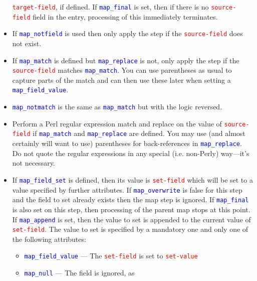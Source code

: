 \documentclass{ltxdockit}
\begin{document}
\begin{itemize}
  \textcolor{red}{\texttt{target-field}}, if defined. If
  \textcolor{blue}{\texttt{map\_final}} is set, then if there is no
  \textcolor{red}{\texttt{source-field}} field in the entry, processing of
  this  immediately terminates.
\item If \textcolor{blue}{\texttt{map\_notfield}} is used then only apply
  the step if the \textcolor{red}{\texttt{source-field}} does not exist.
\item If \textcolor{blue}{\texttt{map\_match}} is defined but
  \textcolor{blue}{\texttt{map\_replace}} is not, only apply the
  step if the \textcolor{red}{\texttt{source-field}} matches
  \textcolor{blue}{\texttt{map\_match}}. You can use parentheses as usual
  to capture parts of the match and can then use these later when setting a \textcolor{blue}{\texttt{map\_field\_value}}.
\item \textcolor{blue}{\texttt{map\_notmatch}} is the same as
  \textcolor{blue}{\texttt{map\_match}} but with the logic reversed.
\item Perform a Perl regular expression match and replace on the value of
  \textcolor{red}{\texttt{source-field}} if
  \textcolor{blue}{\texttt{map\_match}} and
  \textcolor{blue}{\texttt{map\_replace}} are defined. You may use (and almost certainly
  will want to use) parentheses for back-references in \textcolor{blue}{\texttt{map\_replace}}.
  Do not quote the regular expressions in any special (i.e. non-Perly) way---it's not
  necessary.
\item If \textcolor{blue}{\texttt{map\_field\_set}} is defined, then its
  value is \textcolor{red}{\texttt{set-field}} which will be set to a value
  specified by further attributes. If
  \textcolor{blue}{\texttt{map\_overwrite}} is false for this step and the
  field to set already exists then the map step is ignored. If
  \textcolor{blue}{\texttt{map\_final}} is also set on this step, then
  processing of the parent map stops at this point. If
  \textcolor{blue}{\texttt{map\_append}} is set, then the value to set is
  appended to the current value of \textcolor{red}{\texttt{set-field}}. The
  value to set is specified by a mandatory one and only one of the
  following attributes:
  \begin{itemize}
    \item \textcolor{blue}{\texttt{map\_field\_value}} --- The
      \textcolor{red}{\texttt{set-field}} is set to
      \textcolor{red}{\texttt{set-value}}
    \item \textcolor{blue}{\texttt{map\_null}} --- The field is ignored, as

\end{itemize}
\end{itemize}
\end{document}
